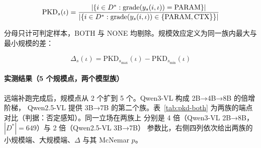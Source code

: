 \documentclass[10.5pt,compsoc,UTF8]{CjC}
\theoremstyle{mystyle}
\begin{document}
\begin{equation*}
  \resizebox{\ifdim\width>\linewidth \linewidth\else\width\fi}{!}{$\displaystyle \text{PKD}_s(\iota) =\allowbreak{} \frac{\left|\{i \in D^* : \text{grade}(y_s(i,\iota)) = \text{PARAM}\}\right|}{\left|\{i \in D^* : \text{grade}(y_s(i,\iota)) \in \{\text{PARAM}, \text{CTX}\}\}\right|}$}
\end{equation*}

分母只计可判定样本，BOTH 与 NONE 均剔除。规模效应定义为同一族内最大与最小规模的差：

\begin{equation}
  \Delta_s(\iota) = \text{PKD}_{s_{\max}}(\iota) - \text{PKD}_{s_{\min}}(\iota)
\end{equation}

\paragraph{实测结果（5 个规模点，两个模型族）}
\label{sec:4-2-3-1}

远端补跑完成后，规模点从 2 个扩到 5 个。Qwen3-VL 构成 2B→4B→8B 的倍增阶梯，
Qwen2.5-VL 提供 3B→7B 的第二个族。表~\ref{tab:pkd-both} 为两族的端点对比（判据：否定感知）。同一立场在两族上
分别是 4 倍（Qwen3-VL 2B→8B，$|D^*| = 649$）与 2 倍（Qwen2.5-VL 3B→7B）
参数比，右侧四列依次给出两族的小规模端、大规模端、$\Delta$ 与其 McNemar $p$。
\end{document}
